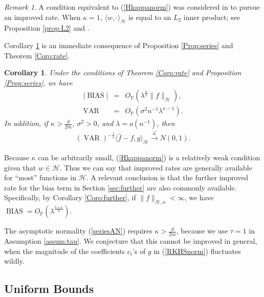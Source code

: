 \documentclass[12pt]{article}
\theoremstyle{plain}
\newtheorem{corollary}{Corollary}
\theoremstyle{remark}
\newtheorem{remark}{Remark}
\begin{document}
\begin{remark}
    A condition equivalent to (\ref{Hkappanorm}) was considered in \cite{dicker2017kernel} to pursue an improved rate. When $\kappa=1$, $\langle w,\cdot\rangle_\mathcal{H}$ is equal to an $L_2$ inner product; see Proposition \ref{prop:L2} and \cite{tuo2020improved,wendland2004scattered}.
\end{remark}

Corollary \ref{Coro:series} is an immediate consequence of Proposition \ref{Prop:series} and Theorem \ref{Coro:rate}.

\begin{corollary}\label{Coro:series}
    Under the conditions of Theorem \ref{Coro:rate} and Proposition \ref{Prop:series}, we have
    \begin{eqnarray*}
        |\operatorname{BIAS}|&=&O_\mathbb{P}(\lambda^{\frac{\kappa}{2}}\|f\|_\mathcal{H}),\\
        \operatorname{VAR}&=&O_\mathbb{P}(\sigma^2n^{-1}\lambda^{\kappa-1}).
    \end{eqnarray*}
    In addition, if $\kappa>\frac{d}{2m}$, $\sigma^2>0$, and $\lambda=o(n^{-1})$, then 
    \begin{eqnarray}\label{seriesAN}
        (\operatorname{VAR})^{-\frac{1}{2}}\langle \hat{f}-f,g\rangle_\mathcal{H}\xrightarrow{\mathscr{L}}N(0,1).
    \end{eqnarray}
\end{corollary}

Because $\kappa$ can be arbitrarily small, (\ref{Hkappanorm}) is a relatively weak condition given that $w\in\mathcal{H}$. Thus we can say that improved rates are generally available for ``most'' functions in $\mathcal{H}$. A relevant conclusion is that the further improved rate for the bias term in Section \ref{sec:further} are also commonly available. Specifically, by Corollary \ref{Coro:further}, if $\|f\|_{\mathcal{H},\kappa}<\infty$, we have $\operatorname{BIAS}=O_\mathbb{P}(\lambda^{\frac{\delta+\kappa}{2}})$.

The asymptotic normality (\ref{seriesAN}) requires $\kappa>\frac{d}{2m}$, because we use $\tau=1$ in Assumption \ref{assum:tau}. We conjecture that this cannot be improved in general, when the magnitude of the coefficients $c_i$'s of $g$ in (\ref{RKHSnorm}) fluctuates wildly. 

\subsection{Uniform Bounds}\label{sec:uniformSup}
\end{document}
